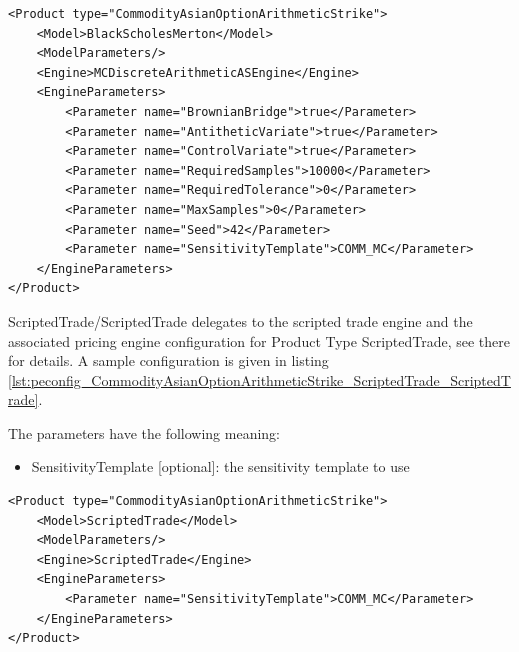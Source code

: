 \begin{longlisting}
\begin{verbatim}
<Product type="CommodityAsianOptionArithmeticStrike">
    <Model>BlackScholesMerton</Model>
    <ModelParameters/>
    <Engine>MCDiscreteArithmeticASEngine</Engine>
    <EngineParameters>
        <Parameter name="BrownianBridge">true</Parameter>
        <Parameter name="AntitheticVariate">true</Parameter>
        <Parameter name="ControlVariate">true</Parameter>
        <Parameter name="RequiredSamples">10000</Parameter>
        <Parameter name="RequiredTolerance">0</Parameter>
        <Parameter name="MaxSamples">0</Parameter>
        <Parameter name="Seed">42</Parameter>
        <Parameter name="SensitivityTemplate">COMM_MC</Parameter>
    </EngineParameters>
</Product>
\end{verbatim}
\caption{Configuration for Product CommodityAsianOptionArithmeticStrike, Model BlackScholesMerton, Engine MCDiscreteArithmeticASEngine}
\label{lst:peconfig_CommodityAsianOptionArithmeticStrike_BlackScholesMerton_MCDiscreteArithmeticASEngine}
\end{longlisting}

ScriptedTrade/ScriptedTrade delegates to the scripted trade engine and the associated pricing engine configuration for
Product Type ScriptedTrade, see there for details. A sample configuration is given in listing
\ref{lst:peconfig_CommodityAsianOptionArithmeticStrike_ScriptedTrade_ScriptedTrade}.

The parameters have the following meaning:

\begin{itemize}
\item SensitivityTemplate [optional]: the sensitivity template to use
\end{itemize}

\begin{longlisting}
\begin{verbatim}
<Product type="CommodityAsianOptionArithmeticStrike">
    <Model>ScriptedTrade</Model>
    <ModelParameters/>
    <Engine>ScriptedTrade</Engine>
    <EngineParameters>
        <Parameter name="SensitivityTemplate">COMM_MC</Parameter>
    </EngineParameters>
</Product>
\end{verbatim}
\caption{Configuration for Product CommodityAsianOptionArithmeticStrike, Model ScriptedTrade, Engine ScriptedTrade}
\label{lst:peconfig_CommodityAsianOptionArithmeticStrike_ScriptedTrade_ScriptedTrade}
\end{longlisting}

